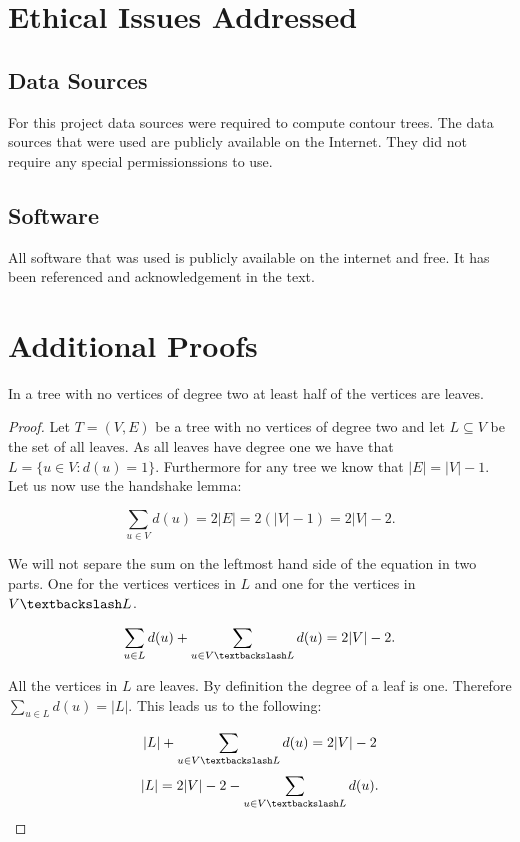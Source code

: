 \begin{appendices}
\chapter{Ethical Issues Addressed}
\label{chapter-ethical}

\section{Data Sources}

For this project data sources were required to compute contour trees. The data sources that were used are publicly available on the Internet. They did not require any special permissionssions to use.

\section{Software}
All software that was used is publicly available on the internet and free. It has been referenced and acknowledgement in the text.

\chapter{Additional Proofs}
\label{chapter-proofs}

\begin{lem} In a tree with no vertices of degree two at least half of the vertices are leaves. \end{lem}

\begin{proof}
    Let $T = (V, E)$ be a tree with no vertices of degree two and let $L \subseteq V$ be the set of all leaves. As all leaves have degree one we have that $L = \{u \in V: d(u) = 1\}$. Furthermore for any tree we know that $|E| = |V| - 1$. Let us now use the handshake lemma:

    $$ \sum_{u \in V}{d(u)} = 2|E| = 2(|V| - 1) = 2|V| - 2.$$

    We will not separe the sum on the leftmost hand side of the equation in two parts. One for the vertices vertices in $L$ and one for the vertices in $V\textbackslash L$.


    $$ \sum_{u \in L}{d(u)} + \sum_{u \in V\textbackslash L}{d(u)} = 2|V| - 2.$$

    All the vertices in $L$ are leaves. By definition the degree of a leaf is one. Therefore $\sum_{u \in L}{d(u)} = |L|$. This leads us to the following:

    $$  |L| + \sum_{u \in V\textbackslash L}{d(u)} = 2|V| - 2$$
    $$  |L|  = 2|V| - 2 - \sum_{u \in V\textbackslash L}{d(u)}.$$


\end{proof}
\end{appendices}
